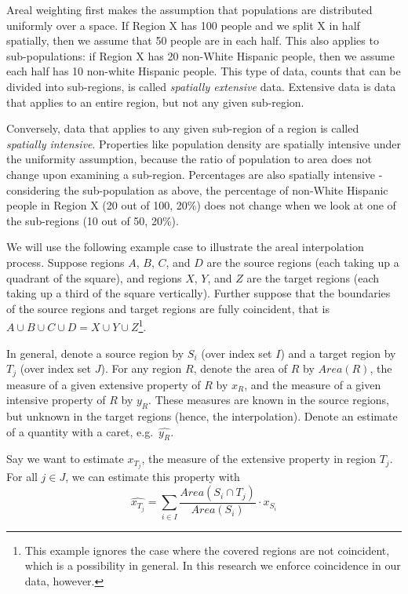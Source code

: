 \documentclass[12pt,twoside]{reedthesis}
\begin{document}
Areal weighting first makes the assumption that populations are distributed uniformly over a space. If Region X has 100 people and we split X in half spatially, then we assume that 50 people are in each half. This also applies to sub-populations: if Region X has 20 non-White Hispanic people, then we assume each half has 10 non-white Hispanic people. This type of data, counts that can be divided into sub-regions, is called \emph{spatially extensive} data. Extensive data is data that applies to an entire region, but not any given sub-region.

Conversely, data that applies to any given sub-region of a region is called \emph{spatially intensive}. Properties like population density are spatially intensive under the uniformity assumption, because the ratio of population to area does not change upon examining a sub-region. Percentages are also spatially intensive - considering the sub-population as above, the percentage of non-White Hispanic people in Region X (20 out of 100, 20\%) does not change when we look at one of the sub-regions (10 out of 50, 20\%).

We will use the following example case to illustrate the areal interpolation process. Suppose regions \(A\), \(B\), \(C\), and \(D\) are the source regions (each taking up a quadrant of the square), and regions \(X\), \(Y\), and \(Z\) are the target regions (each taking up a third of the square vertically). Further suppose that the boundaries of the source regions and target regions are fully coincident, that is \(A \cup B \cup C \cup D = X \cup Y \cup Z\)\footnote{This example ignores the case where the covered regions are not coincident, which is a possibility in general. In this research we enforce coincidence in our data, however.}.

In general, denote a source region by \(S_i\) (over index set \(I\)) and a target region by \(T_j\) (over index set \(J\)). For any region \(R\), denote the area of \(R\) by \(Area(R)\), the measure of a given extensive property of \(R\) by \(x_R\), and the measure of a given intensive property of \(R\) by \(y_R\). These measures are known in the source regions, but unknown in the target regions (hence, the interpolation). Denote an estimate of a quantity with a caret, e.g.~\(\widehat{y_{R}}\).

Say we want to estimate \(x_{T_j}\), the measure of the extensive property in region \(T_j\). For all \(j \in J\), we can estimate this property with
\[
\widehat{x_{T_j}} = \sum_{i \in I} \frac{Area(S_i \cap T_j)}{Area(S_i)} \cdot x_{S_i}
\]
\end{document}
